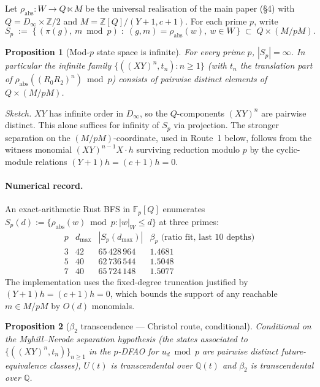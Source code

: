 \documentclass[11pt,a4paper]{article}
\newtheorem{proposition}{Proposition}
\theoremstyle{remark}
\theoremstyle{plain}
\begin{document}
Let $\rho_{\mathrm{abs}}: W \to Q \ltimes M$ be the universal
realisation of the main paper (\S4) with $Q = D_\infty \times \mathbb{Z}/2$
and $M = \mathbb{Z}[Q]/(Y+1, c+1)$.  For each prime $p$, write
\[
S_p \;:=\; \bigl\{\,(\pi(g),\, m \bmod p) \;:\; (g,m) = \rho_{\mathrm{abs}}(w),\ w \in W \,\bigr\}
\;\subset\; Q \times (M/pM).
\]

\begin{proposition}[Mod-$p$ state space is infinite]
\label{prop:modp-state-infinite}
For every prime $p$, $|S_p| = \infty$.  In particular the infinite
family $\{((XY)^n, t_n) : n \ge 1\}$ (with $t_n$ the translation part
of $\rho_{\mathrm{abs}}((R_0 R_2)^n) \bmod p$) consists of pairwise
distinct elements of $Q \times (M/pM)$.
\end{proposition}

\emph{Sketch.}  $XY$ has infinite order in $D_\infty$, so the
$Q$-components $(XY)^n$ are pairwise distinct.  This alone suffices for
infinity of $S_p$ via projection.  The stronger separation on the
$(M/pM)$-coordinate, used in Route~1 below, follows from the witness
monomial $(XY)^{n-1} X \cdot h$ surviving reduction modulo $p$ by the
cyclic-module relations $(Y+1)h = (c+1)h = 0$.

\paragraph{Numerical record.}
An exact-arithmetic Rust BFS in $\mathbb{F}_p[Q]$ enumerates $S_p(d) :=
\{\rho_{\mathrm{abs}}(w) \bmod p : |w|_W \le d\}$ at three primes:
\[
\begin{array}{c|c|c|c}
p & d_{\max} & |S_p(d_{\max})| & \beta_p \text{ (ratio fit, last 10 depths)} \\ \hline
3 & 42 & 65\,428\,964 & 1.4681 \\
5 & 40 & 62\,736\,544 & 1.5048 \\
7 & 40 & 65\,724\,148 & 1.5077
\end{array}
\]
The implementation uses the fixed-degree truncation justified by
$(Y+1)h = (c+1)h = 0$, which bounds the support of any reachable
$m \in M/pM$ by $O(d)$ monomials.

\begin{proposition}[$\beta_2$ transcendence --- Christol route, conditional]
\label{prop:beta2-christol}
Conditional on the Myhill--Nerode separation hypothesis (the states
associated to $\{((XY)^n, t_n)\}_{n \ge 1}$ in the $p$-DFAO for
$u_d \bmod p$ are pairwise distinct future-equivalence classes), $U(t)$
is transcendental over $\mathbb{Q}(t)$ and $\beta_2$ is transcendental
over $\mathbb{Q}$.
\end{proposition}
\end{document}
